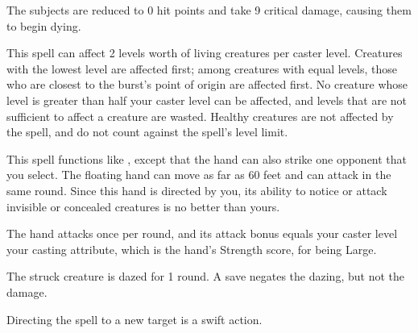 \spellrng{\rngmed}
\begin{spellblood}
  The subjects are reduced to 0 hit points and take 9 critical damage, causing them to begin dying.
\end{spellblood}
\begin{spellnotes}
  This spell can affect 2 levels worth of living creatures per caster level. Creatures with the lowest level are affected first; among creatures with equal levels, those who are closest to the burst's point of origin are affected first. No creature whose level is greater than half your caster level can be affected, and levels that are not sufficient to affect a creature are wasted. Healthy creatures are not affected by the spell, and do not count against the spell's level limit.
\end{spellnotes}

\begin{spelleffect}
  This spell functions like , except that the hand can also strike one opponent that you select. The floating hand can move as far as 60 feet and can attack in the same round. Since this hand is directed by you, its ability to notice or attack invisible or concealed creatures is no better than yours.
  \par The hand attacks once per round, and its attack bonus equals your caster level \add your casting attribute, which is the hand's Strength score,  for being Large.
\end{spelleffect}
\begin{spellblood}
  The struck creature is dazed for 1 round. A save negates the dazing, but not the damage.
\end{spellblood}
\begin{spellnotes}
  Directing the spell to a new target is a swift action.
\end{spellnotes}

